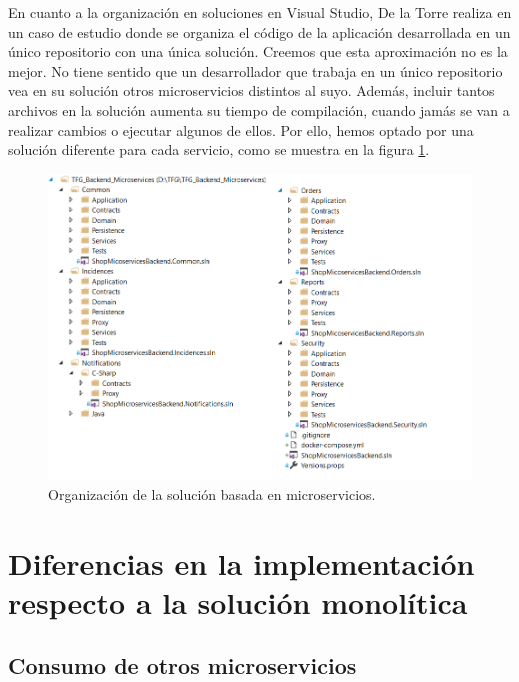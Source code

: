 \documentclass[11pt,spanish,listoffigures]{tfgetsinf}
\begin{document}
En cuanto a la organización en soluciones en Visual Studio, De la Torre realiza en\cite{DelaTorre2018} un caso de estudio donde se organiza el código de la aplicación desarrollada en un único repositorio con una única solución. Creemos que esta aproximación no es la mejor. No tiene sentido que un desarrollador que trabaja en un único repositorio vea en su solución otros microservicios distintos al suyo. Además, incluir tantos archivos en la solución aumenta su tiempo de compilación, cuando jamás se van a realizar cambios o ejecutar algunos de ellos. Por ello, hemos optado por una solución diferente para cada servicio, como se muestra en la figura \ref{fig:MicroservicesSolution}.

\begin{figure}[h]
\centering
\includegraphics[scale=0.85]{MicroservicesSolution}
\caption{Organización de la solución basada en microservicios.}
\label{fig:MicroservicesSolution}
\end{figure}

\newpage

\section{Diferencias en la implementación respecto a la solución monolítica}

\subsection{Consumo de otros microservicios} \label{subsect:Consumo}
\end{document}
